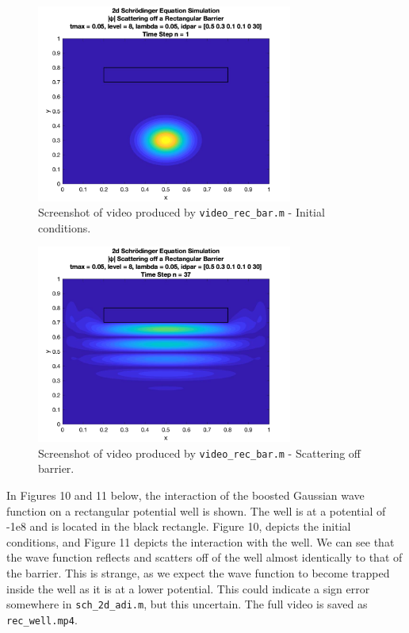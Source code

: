 \documentclass[10pt]{article}
\def\code#1{\texttt{#1}} %
\begin{document}
\begin{figure}[H]
\centering
\includegraphics[width=0.75\textwidth]{problem2/rec_bar_1.png}
\caption{Screenshot of video produced by \code{video\_rec\_bar.m} - Initial conditions.}
\end{figure}
\begin{figure}[H]
\centering
\includegraphics[width=0.75\textwidth]{problem2/rec_bar_2.png}
\caption{Screenshot of video produced by \code{video\_rec\_bar.m} - Scattering off barrier.}
\end{figure}

In Figures 10 and 11 below, the interaction of the boosted Gaussian wave function on a rectangular
potential well is shown. The well is at a potential of -1e8 and is located in the black rectangle.
Figure 10, depicts the initial conditions, and Figure 11 depicts the 
interaction with the well. We can see that the wave function reflects and scatters off of the well 
almost identically to that of the barrier. This is strange, as we expect the wave function to become
trapped inside the well as it is at a lower potential. This could indicate a sign error somewhere in 
\code{sch\_2d\_adi.m}, but this uncertain. The full video is saved as \code{rec\_well.mp4}.
\end{document}
